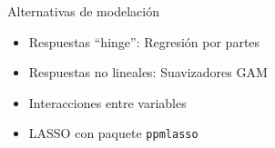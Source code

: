 \documentclass[
  11pt,
  ignorenonframetext,
]{beamer}
\providecommand{\tightlist}{%
  \setlength{\itemsep}{0pt}\setlength{\parskip}{0pt}}
\begin{document}
\begin{frame}[fragile]{Alternativas de modelación}
\protect\hypertarget{alternativas-de-modelaciuxf3n}{}
\begin{itemize}
\tightlist
\item
  Respuestas ``hinge'': Regresión por partes
\item
  Respuestas no lineales: Suavizadores GAM
\item
  Interacciones entre variables
\item
  LASSO con paquete \texttt{ppmlasso}
\end{itemize}
\end{frame}
\end{document}
